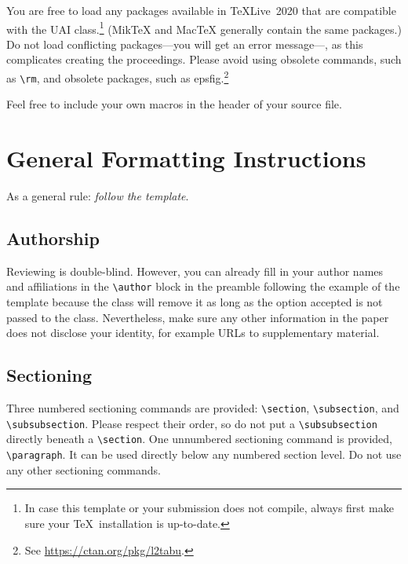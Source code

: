 \documentclass{uai2023} %
\newcommand{\swap}[3][-]{#3#1#2} %
\begin{document}
You are free to load any packages available in \TeX{Live}~2020 that are compatible with the UAI class.\footnote{In case this template or your submission does not compile, always first make sure your \TeX\ installation is up-to-date.}
(Mik\TeX{} and Mac\TeX{} generally contain the same packages.)
Do not load conflicting packages—you will get an error message—, as this complicates creating the proceedings.
Please avoid using obsolete commands, such as \verb|\rm|, and obsolete packages, such as \textsf{epsfig}.\footnote{%
    See \url{https://ctan.org/pkg/l2tabu}.
}

\swap[ ]{in the header of your source file.}{Feel free to include your own macros}

\section{General Formatting Instructions}
As a general rule: \emph{follow the template}.

\subsection{Authorship}
Reviewing is double-blind.
However, you can already fill in your author names and affiliations in the \verb|\author| block in the preamble following the example of the template because the class will remove it as long as the option \textsf{accepted} is not passed to the class.
Nevertheless, make sure any other information in the paper does not disclose your identity, for example URLs to supplementary material.

\subsection{Sectioning}
Three numbered sectioning commands are provided: \verb|\section|, \verb|\subsection|, and \verb|\subsubsection|.
Please respect their order, so do not put a \verb|\subsubsection| directly beneath a \verb|\section|.
One unnumbered sectioning command is provided, \verb|\paragraph|.
It can be used directly below any numbered section level.
Do not use any other sectioning commands.
\end{document}
